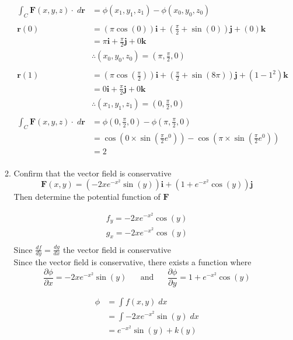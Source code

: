\documentclass[a4paper,11pt]{article}
\begin{document}
\begin{preview}
\begin{enumerate}
\begin{enumerate}
    \begin{align*}
        \int_C \textbf{F}(x,y,z) \cdot \; d \textbf{r} &= \phi(x_1, y_1, z_1) - \phi(x_0, y_0, z_0)\\\\
        \textbf{r}(0) &= \left( \pi \cos(0) \right) \textbf{i} + \left( \frac{\pi}{2} + \sin(0) \right) \textbf{j}  + \left(0\right) \textbf{k}\\
        &= \pi \textbf{i} + \frac{\pi}{2} \textbf{j} + 0 \textbf{k}\\
        &\therefore (x_0, y_0, z_0) = (\pi, \frac{\pi}{2}, 0)\\\\
        \textbf{r}(1) &= \left( \pi \cos(\frac{\pi}{2}) \right) \textbf{i} + \left( \frac{\pi}{2} + \sin(8 \pi) \right) \textbf{j}  + \left(1-1^2\right) \textbf{k}\\
        &= 0 \textbf{i} + \frac{\pi}{2} \textbf{j} + 0 \textbf{k}\\
        &\therefore (x_1, y_1, z_1) = (0, \frac{\pi}{2}, 0)\\\\
        \int_C \textbf{F}(x,y,z) \cdot \; d \textbf{r} &= \phi(0, \frac{\pi}{2}, 0) - \phi(\pi, \frac{\pi}{2}, 0)\\
        &= \cos(0 \times \sin(\frac{\pi}{2} e^0)) - \cos(\pi \times \sin(\frac{\pi}{2} e^0))\\
        &= 2\\
    \end{align*}

    \item Confirm that the vector field is conservative
    $$ \textbf{F}(x,y) = \left( -2xe^{-x^2}\sin(y) \right) \textbf{i} + \left( 1+e^{-x^2}\cos(y) \right) \textbf{j} $$
    Then determine the potential function of $\textbf{F}$

    \begin{align*}
        f_y = -2x e^{-x^2}\cos(y)\\
        g_x = -2x e^{-x^2}\cos(y)\\
    \end{align*}
    Since $\frac{df}{dy} = \frac{dg}{dx}$ the vector field is conservative\\

    Since the vector field is conservative, there exists a function where 
    $$ \frac{\partial \phi}{\partial x} = -2xe^{-x^2}\sin(y) \mathrm{\;\;\;\;\;\; and \;\;\;\;\;\;} \frac{\partial \phi}{\partial y} = 1+e^{-x^2}\cos(y) $$

    \begin{align*}
        \phi &= \int f(x,y) \; dx\\
        &= \int -2xe^{-x^2}\sin(y) \; dx\\ 
        &= e^{-x^2}\sin(y) +k(y)\\
    \end{align*}


\end{enumerate}
\end{enumerate}
\end{preview}
\end{document}
